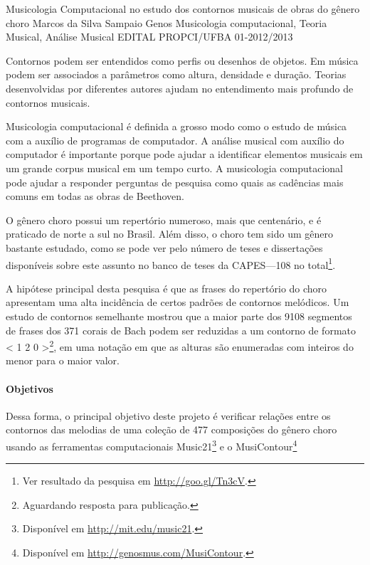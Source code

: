 \documentclass[11pt]{article}
\begin{document}

\dadosProjetoOrientador
{Musicologia Computacional no estudo dos contornos musicais de obras
  do gênero choro}
{Marcos da Silva Sampaio}
{Genos}
{Musicologia computacional, Teoria Musical, Análise Musical}
{EDITAL PROPCI/UFBA 01-2012/2013}

\newpage

\onehalfspace


Contornos podem ser entendidos como perfis ou desenhos de objetos. Em
música podem ser associados a parâmetros como altura, densidade e
duração. Teorias desenvolvidas por diferentes autores
\cite{Friedmann1985,Morris1987,Marvin1988,Bor2009} ajudam no
entendimento mais profundo de contornos musicais.

Musicologia computacional é definida a grosso modo como o estudo de
música com a auxílio de programas de computador. A análise musical com
auxílio do computador é importante porque pode ajudar a identificar
elementos musicais em um grande corpus musical em um tempo curto. A
musicologia computacional pode ajudar a responder perguntas de
pesquisa como quais as cadências mais comuns em todas as obras de
Beethoven.

O gênero choro possui um repertório numeroso, mais que centenário, e é
praticado de norte a sul no Brasil. Além disso, o choro tem sido um
gênero bastante estudado, como se pode ver pelo número de teses e
dissertações disponíveis sobre este assunto no banco de teses da
CAPES---108 no total\footnote{Ver resultado da pesquisa em
  \url{http://goo.gl/Tn3cV}.}.

A hipótese principal desta pesquisa é que as frases do repertório do
choro apresentam uma alta incidência de certos padrões de contornos
melódicos. Um estudo de contornos semelhante mostrou que a maior parte
dos 9108 segmentos de frases dos 371 corais de Bach podem ser
reduzidas a um contorno de formato < 1 2 0 >\footnote{Aguardando
  resposta para publicação.}, em uma notação em que as alturas são
enumeradas com inteiros do menor para o maior valor.

\paragraph{Objetivos}
\label{sec:objetivos}

Dessa forma, o principal objetivo deste projeto é verificar relações
entre os contornos das melodias de uma coleção de 477 composições do
gênero choro usando as ferramentas computacionais
Music21\footnote{Disponível em \url{http://mit.edu/music21}.} e o
MusiContour\footnote{Disponível em
  \url{http://genosmus.com/MusiContour}.}
\end{document}
